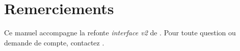 \documentclass[11pt,a4paper,twoside,openright,numbers=noenddot]{scrbook}
\begin{document}
\frontmatter


\tableofcontents
\cleardoublepage

\mainmatter









\backmatter
\cleardoublepage
\chapter*{Remerciements}
Ce manuel accompagne la refonte \emph{interface v2} de \manualproduct. Pour toute question ou demande de compte, contactez \manualeditor.
\end{document}
